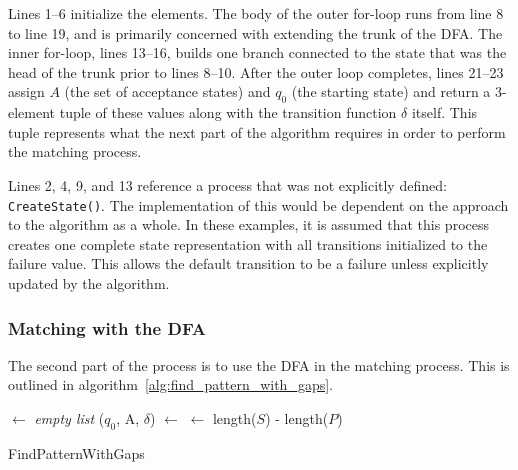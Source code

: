 Lines 1--6 initialize the elements. The body of the outer for-loop runs from line 8 to line 19, and is primarily concerned with extending the trunk of the DFA. The inner for-loop, lines 13--16, builds one branch connected to the state that was the head of the trunk prior to lines 8--10. After the outer loop completes, lines 21--23 assign $A$ (the set of acceptance states) and $q_0$ (the starting state) and return a 3-element tuple of these values along with the transition function $\delta$ itself. This tuple represents what the next part of the algorithm requires in order to perform the matching process.

Lines 2, 4, 9, and 13 reference a process that was not explicitly defined: \texttt{CreateState()}. The implementation of this would be dependent on the approach to the algorithm as a whole. In these examples, it is assumed that this process creates one complete state representation with all transitions initialized to the failure value. This allows the default transition to be a failure unless explicitly updated by the algorithm.

\subsubsection{Matching with the DFA}

The second part of the process is to use the DFA in the matching process. This is outlined in algorithm~\ref{alg:find_pattern_with_gaps}.

\IncMargin{1em}
\begin{algorithm}[ht]
  \DontPrintSemicolon

  \BlankLine
  \Matches $\leftarrow$ \textit{empty list}\;
  ($q_0$, A, $\delta$) $\leftarrow$ \;
  \End $\leftarrow$ length($S$) - length($P$)\;
  \KwRet{\Matches}\;
\caption{FindPatternWithGaps}
\label{alg:find_pattern_with_gaps}
\end{algorithm}
\DecMargin{1em}


